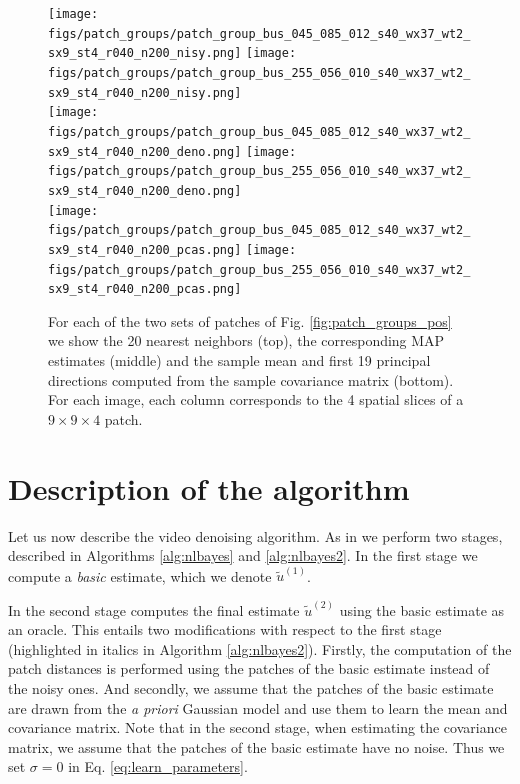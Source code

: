 \documentclass[10pt, a4paper]{article}
\begin{document}
\begin{figure}[htpb!]
	\centering
	\texttt{[image: figs/patch\_groups/patch\_group\_bus\_045\_085\_012\_s40\_wx37\_wt2\_sx9\_st4\_r040\_n200\_nisy.png]}
	\hfill
	\texttt{[image: figs/patch\_groups/patch\_group\_bus\_255\_056\_010\_s40\_wx37\_wt2\_sx9\_st4\_r040\_n200\_nisy.png]}\\
	\vspace{.2cm}
	\texttt{[image: figs/patch\_groups/patch\_group\_bus\_045\_085\_012\_s40\_wx37\_wt2\_sx9\_st4\_r040\_n200\_deno.png]}
	\hfill
	\texttt{[image: figs/patch\_groups/patch\_group\_bus\_255\_056\_010\_s40\_wx37\_wt2\_sx9\_st4\_r040\_n200\_deno.png]}\\
	\vspace{.2cm}
	\texttt{[image: figs/patch\_groups/patch\_group\_bus\_045\_085\_012\_s40\_wx37\_wt2\_sx9\_st4\_r040\_n200\_pcas.png]}
	\hfill
	\texttt{[image: figs/patch\_groups/patch\_group\_bus\_255\_056\_010\_s40\_wx37\_wt2\_sx9\_st4\_r040\_n200\_pcas.png]}\\
	\vspace{.2cm}
	\caption{For each of the two sets of patches of Fig. \ref{fig:patch_groups_pos} we show
	the 20 nearest neighbors (top), the corresponding MAP estimates (middle) and the sample mean 
	and first 19 principal directions computed from the sample covariance matrix (bottom).
	For each image, each column corresponds to the 4 spatial slices of a $9\times9\times4$ patch.}
	\label{fig:patch_groups_patches}
\end{figure}

\section{Description of the algorithm}
\label{sec:algorithm}

Let us now describe the video denoising algorithm. As in
\cite{Dabov2007tip,Dabov2007v,Maggioni2012,Lebrun2013a} we perform two stages, described in 
Algorithms \ref{alg:nlbayes} and \ref{alg:nlbayes2}. In the first stage we
compute a \emph{basic} estimate, which we denote $\widetilde u^{(1)}$. 

In the second stage computes the final estimate $\widetilde u^{(2)}$ using the
basic estimate as an oracle. This entails two modifications with respect to the
first stage (highlighted in italics in Algorithm \ref{alg:nlbayes2}). Firstly, the
computation of the patch distances is performed using the patches of the basic
estimate instead of the noisy ones. And secondly, we assume that the patches of
the basic estimate are drawn from the \textit{a priori} Gaussian model and use
them to learn the mean and covariance matrix. Note that in the second stage,
when estimating the covariance matrix, we assume that the patches of the basic
estimate have no noise. Thus we set $\sigma = 0$ in Eq.
\eqref{eq:learn_parameters}.
\end{document}
